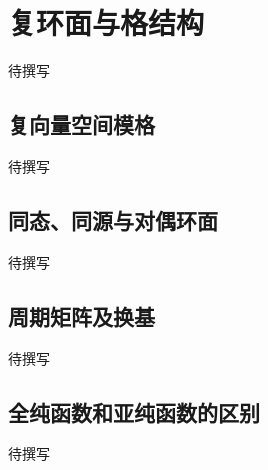 
% 
% 

\section{复环面与格结构}
\label{g4:sec:2101}

待撰写

\subsection{复向量空间模格}
\label{g4:subsec:2101:01}
待撰写

\subsection{同态、同源与对偶环面}
\label{g4:subsec:2101:02}
待撰写

\subsection{周期矩阵及换基}
\label{g4:subsec:2101:03}
待撰写

\subsection{全纯函数和亚纯函数的区别}
\label{g4:subsec:2101:04}
待撰写
